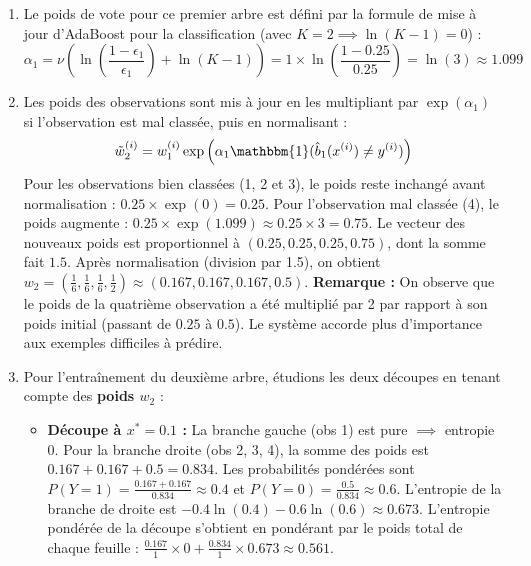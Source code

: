 \documentclass[solutions]{../exercices}
\begin{document}
\begin{solution}
\begin{enumerate}
    \item Le poids de vote pour ce premier arbre est défini par la formule de mise à jour d'AdaBoost pour la classification (avec $K=2 \implies \ln(K-1) = 0$) :
    \begin{equation*}
        \alpha_1 = \nu \left(\ln\left(\frac{1-\epsilon_1}{\epsilon_1}\right) + \ln(K-1)\right) = 1 \times \ln\left(\frac{1-0.25}{0.25}\right) = \ln(3) \approx 1.099
    \end{equation*}
    \item Les poids des observations sont mis à jour en les multipliant par $\exp(\alpha_1)$ si l'observation est mal classée, puis en normalisant :
    \begin{equation*}
        \tilde{w}_2^{(i)} = w_1^{(i)} \exp\left(\alpha_1 \mathbbm{1}(\hat{b}_1(x^{(i)}) \neq y^{(i)})\right)
    \end{equation*}
    Pour les observations bien classées (1, 2 et 3), le poids reste inchangé avant normalisation : $0.25 \times \exp(0) = 0.25$.
    Pour l'observation mal classée (4), le poids augmente : $0.25 \times \exp(1.099) \approx 0.25 \times 3 = 0.75$.
    Le vecteur des nouveaux poids est proportionnel à $(0.25, 0.25, 0.25, 0.75)$, dont la somme fait $1.5$.
    Après normalisation (division par 1.5), on obtient $w_2 = (\frac{1}{6}, \frac{1}{6}, \frac{1}{6}, \frac{1}{2}) \approx (0.167, 0.167, 0.167, 0.5)$.
    \textbf{Remarque :} On observe que le poids de la quatrième observation a été multiplié par 2 par rapport à son poids initial (passant de $0.25$ à $0.5$). Le système accorde plus d'importance aux exemples difficiles à prédire.
    \item Pour l'entraînement du deuxième arbre, étudions les deux découpes en tenant compte des \textbf{poids $w_2$} :
    \begin{itemize}
        \item \textbf{Découpe à $x^* = 0.1$ :} 
        La branche gauche (obs 1) est pure $\implies$ entropie 0. 
        Pour la branche droite (obs 2, 3, 4), la somme des poids est $0.167 + 0.167 + 0.5 = 0.834$. 
        Les probabilités pondérées sont $P(Y=1) = \frac{0.167+0.167}{0.834} \approx 0.4$ et $P(Y=0) = \frac{0.5}{0.834} \approx 0.6$. 
        L'entropie de la branche de droite est $-0.4 \ln(0.4) - 0.6 \ln(0.6) \approx 0.673$.
        L'entropie pondérée de la découpe s'obtient en pondérant par le poids total de chaque feuille : $\frac{0.167}{1} \times 0 + \frac{0.834}{1} \times 0.673 \approx 0.561$.


\end{itemize}
\end{enumerate}
\end{solution}
\end{document}
